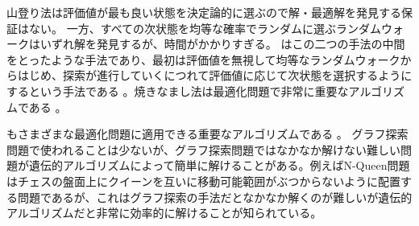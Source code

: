 山登り法は評価値が最も良い状態を決定論的に選ぶので解・最適解を発見する保証はない。
一方、すべての次状態を均等な確率でランダムに選ぶランダムウォークはいずれ解を発見するが、時間がかかりすぎる。
はこの二つの手法の中間をとったような手法であり、最初は評価値を無視して均等なランダムウォークからはじめ、探索が進行していくにつれて評価値に応じて次状態を選択するようにするという手法である \cite{vcerny1985thermodynamical,van1987simulated}。焼きなまし法は最適化問題で非常に重要なアルゴリズムである \cite{kirkpatrick1983optimization}。

もさまざまな最適化問題に適用できる重要なアルゴリズムである \cite{goldberg1989}。
グラフ探索問題で使われることは少ないが、グラフ探索問題ではなかなか解けない難しい問題が遺伝的アルゴリズムによって簡単に解けることがある。例えばN-Queen問題はチェスの盤面上にクイーンを互いに移動可能範囲がぶつからないように配置する問題であるが、これはグラフ探索の手法だとなかなか解くのが難しいが遺伝的アルゴリズムだと非常に効率的に解けることが知られている。

